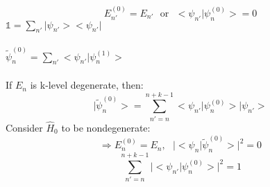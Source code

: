 \documentclass[12pt]{article}
\begin{document}
$$E^{(0)}_{n'} = E_{n'}\,\,\,\,\text{or}\,\,\,\,\big< \psi_{n'} \big| \psi_n^{(0)} \big> = 0$$
$\mathbb{1} = \sum_{n'} \big|\psi_{n'}\big> \big< \psi_{n'} \big|$
\\
\\
$\tilde{\psi}_n^{(0)} = \sum_{n'} \big< \psi_{n'} \big| \psi_n^{(1)} \big> $
\\
\\
If $E_n$ is k-level degenerate, then:
\begin{equation}
	\big| \tilde{\psi}^{(0)}_n \big> = \sum_{n'=n}^{n+k-1} \big< \psi_{n'} \big| \psi_n^{(0)} \big>
	\big|\psi_{n'} \big>
\end{equation}
Consider $\hat{H}_0$ to be nondegenerate: 
$$
	\Longrightarrow E^{(0)}_n = E_n,\,\,\,\,\big|\big< \psi_n | \tilde{\psi}^{(0)}_n \big> \big| ^2 = 0
$$
$$\sum_{n'=n}^{n+k-1}\big| \big< \psi_{n'} \big| \psi_n^{(0)} \big> \big|^2 = 1$$
\end{document}
